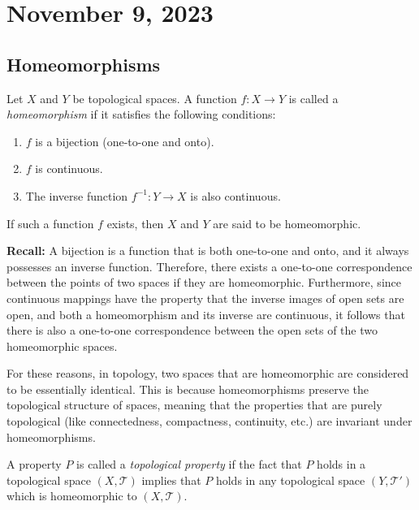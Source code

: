 \newpage
\section{November 9, 2023}
\subsection{Homeomorphisms}

\begin{definition}[Homeomorphism]
    Let \( X \) and \( Y \) be topological spaces. A function \( f: X \to Y \) is called a \textit{homeomorphism} if it satisfies the following conditions:
    \begin{enumerate}
        \item \( f \) is a bijection (one-to-one and onto).
        \item \( f \) is continuous.
        \item The inverse function \( f^{-1}: Y \to X \) is also continuous.
    \end{enumerate}
    If such a function \( f \) exists, then \( X \) and \( Y \) are said to be homeomorphic.
\end{definition}

\textbf{Recall:} A bijection is a function that is both one-to-one and onto, and it always possesses an inverse function. Therefore, there exists a one-to-one correspondence between the points of two spaces if they are homeomorphic. Furthermore, since continuous mappings have the property that the inverse images of open sets are open, and both a homeomorphism and its inverse are continuous, it follows that there is also a one-to-one correspondence between the open sets of the two homeomorphic spaces. 

For these reasons, in topology, two spaces that are homeomorphic are considered to be essentially identical. This is because homeomorphisms preserve the topological structure of spaces, meaning that the properties that are purely topological (like connectedness, compactness, continuity, etc.) are invariant under homeomorphisms.

\begin{definition}
A property \( P \) is called a \textit{topological property} if the fact that \( P \) holds in a topological space \( (X, \mathcal{T}) \) implies that \( P \) holds in any topological space \( (Y, \mathcal{T}') \) which is homeomorphic to \( (X, \mathcal{T}) \).
\end{definition}

